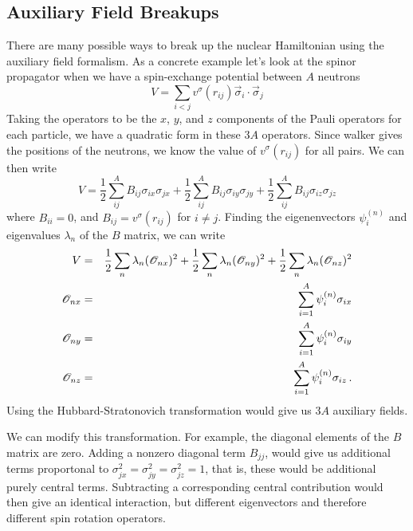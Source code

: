  \subsection{Auxiliary Field Breakups}
 There are many possible ways to break up the nuclear Hamiltonian using
 the auxiliary field formalism. As a concrete example let's look at
 the spinor propagator when we have a spin-exchange potential between $A$
 neutrons
 \begin{equation}
 V = \sum_{i<j}  v^{\sigma}(r_{ij}) \vec \sigma_i \cdot \vec \sigma_j
 \end{equation}
 Taking the operators to be the $x$, $y$, and $z$ components of the
 Pauli operators for each particle, we have a quadratic form in these
 $3A$ operators. Since walker gives the positions of the neutrons, we know
 the value of $v^{\sigma}(r_{ij})$ for all pairs. We can then write
 \begin{equation}
 V = 
 \frac{1}{2} \sum_{ij}^A B_{ij}\sigma_{ix}\sigma_{jx}
 +\frac{1}{2} \sum_{ij}^A B_{ij}\sigma_{iy}\sigma_{jy}
 +\frac{1}{2} \sum_{ij}^A B_{ij}\sigma_{iz}\sigma_{jz}
 \end{equation}
 where $B_{ii} = 0$, and $B_{ij} = v^{\sigma}(r_{ij})$ for  $i \neq j$.
 Finding the eigenenvectors $\psi^{(n)}_i$ and eigenvalues $\lambda_n$
 of the $B$ matrix, we
 can write
 \begin{eqnarray}
 V &=&
 \frac{1}{2} \sum_n \lambda_n ({\cal O}_{nx})^2
 +\frac{1}{2} \sum_n \lambda_n ({\cal O}_{ny})^2
 +\frac{1}{2} \sum_n \lambda_n ({\cal O}_{nz})^2
 \nonumber\\
 {\cal O}_{nx} &=& \sum_{i=1}^A \psi^{(n)}_i \sigma_{ix}
 \nonumber\\
 {\cal O}_{ny} &=& \sum_{i=1}^A \psi^{(n)}_i \sigma_{iy}
 \nonumber\\
 {\cal O}_{nz} &=& \sum_{i=1}^A \psi^{(n)}_i \sigma_{iz} \,.
 \end{eqnarray}
 Using the Hubbard-Stratonovich transformation would give us $3A$ auxiliary
 fields.
 
 We can modify this transformation. For example, the diagonal
 elements of the $B$ matrix are zero. Adding a nonzero diagonal term $B_{jj}$,
 would give us additional terms proportonal to
 $\sigma_{jx}^2 =\sigma_{jy}^2 =\sigma_{jz}^2 = 1$, that is,
 these would be additional purely central terms. Subtracting a corresponding
 central contribution would then give an identical interaction, but
 different eigenvectors and therefore different spin rotation operators.
 
